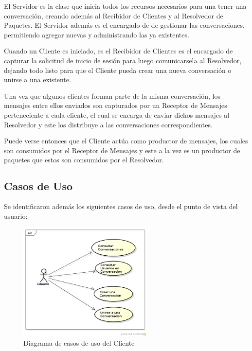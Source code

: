 \documentclass[a4paper,12pt,titlepage]{article}
\begin{document}
El Servidor es la clase que inicia todos los recursos necesarios para una tener una conversación, creando además
al Recibidor de Clientes y al Resolvedor de Paquetes. El Servidor además es el encargado de de gestionar las 
conversaciones, permitiendo agregar nuevas y administrando las ya existentes.

Cuando un Cliente es iniciado, es el Recibidor de Clientes es el encargado de capturar la solicitud de inicio de sesión para luego comunicarsela al Resolvedor, 
dejando todo listo para que el Cliente pueda crear una nueva conversación o unirse a una existente.

Una vez que algunos clientes forman parte de la misma conversación, los mensajes entre ellos enviados son capturados
por un Receptor de Mensajes perteneciente a cada cliente, el cual se encarga de enviar dichos mensajes al Resolvedor y este los distribuye a las conversaciones correspondientes.

Puede verse entonces que el Cliente actúa como productor de mensajes, los cuales son consumidos por el Receptor de Mensajes y este a la vez es un productor de paquetes que estos son consumidos por el Resolvedor.\\

\subsection{Casos de Uso}
Se identificaron además los siguientes casos de uso, desde el punto de vista del usuario:\\
\begin{figure}[h!]
\centering
\includegraphics[width=0.6\textwidth]{CasosDeUso2.png}
\caption{Diagrama de casos de uso del Cliente}
\label{fig:casos_uso}
\end{figure}
\end{document}
